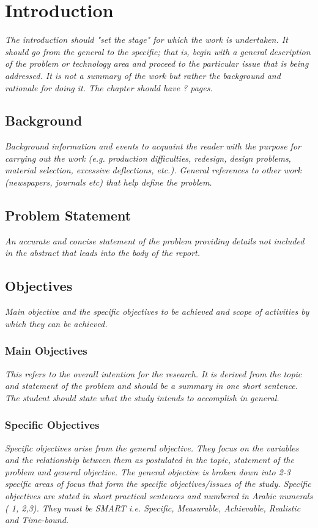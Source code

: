 \chapter{Introduction}
\label{cha:Introduction}      %

\emph{The introduction should "set the stage" for which the work is undertaken.
	It should go from the general to the specific; that is, begin with a general description of the problem or technology area and proceed to the particular issue that is being addressed.
	It is not a summary of the work but rather the background and rationale for doing it. 
	The chapter should have ? pages.}

\section{Background}
\emph{Background information and events to acquaint the reader with the purpose for carrying out the work (e.g. production difficulties, redesign, design problems, material selection, excessive deflections, etc.).
General references to other work (newspapers, journals etc) that help define the problem.}

\section{Problem Statement}
\emph{An accurate and concise statement of the problem providing details not included in the abstract that leads into the body of the report.}

\section{Objectives}
\emph{Main objective and the specific objectives to be achieved and scope of activities by which they can be achieved.}

\subsection{Main Objectives}
\emph{This refers to the overall intention for the research. 
	It is derived from the topic and statement of the problem and should be a summary in one short sentence. 
	The student should state what the study intends to accomplish in general.}

\subsection{Specific Objectives}
\emph{Specific objectives arise from the general objective.
	They focus on the variables and the relationship between them as postulated in the topic, statement of the problem and general objective. 
	The general objective is broken down into 2-3 specific areas of focus that form the specific objectives/issues of the study.
	Specific objectives are stated in short practical sentences and numbered in Arabic numerals ( 1, 2,3).
	They must be SMART i.e. Specific, Measurable, Achievable, Realistic and Time-bound.}

